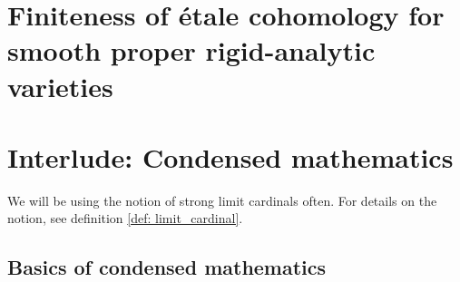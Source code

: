 \section{Finiteness of \'etale cohomology for smooth proper rigid-analytic varieties}
    
\section{Interlude: Condensed mathematics} \label{section: condensed_mathematics}
    \begin{remark}
        We will be using the notion of strong limit cardinals often. For details on the notion, see definition \ref{def: limit_cardinal}.
    \end{remark}

    \subsection{Basics of condensed mathematics}
